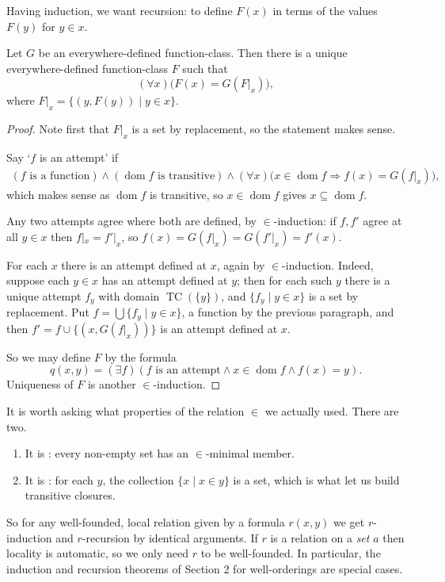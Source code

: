 \documentclass[a4paper]{scrartcl}
\newcommand{\dom}{\operatorname{dom}}
\newcommand{\TC}{\operatorname{TC}}
\begin{document}
Having induction, we want recursion: to define $F(x)$ in terms of the values $F(y)$ for $y \in x$.

\begin{theorem}\label{thm:epsilonrecursion}
Let $G$ be an everywhere-defined function-class. Then there is a unique everywhere-defined function-class $F$ such that
$$(\forall x)\bigl(F(x) = G(F|_x)\bigr),$$
where $F|_x = \{(y, F(y)) \mid y \in x\}$.
\end{theorem}
\begin{proof}
  Note first that $F|_x$ is a set by replacement, so the statement makes sense.

  Say `$f$ is an attempt' if
  \begin{align*}
    (f\text{ is a function}) \land (\dom f\text{ is transitive}) \land (\forall x)\bigl(x \in \dom f \Rightarrow f(x) = G(f|_x)\bigr),
  \end{align*}
  which makes sense as $\dom f$ is transitive, so $x \in \dom f$ gives $x \subseteq \dom f$.

  Any two attempts agree where both are defined, by $\in$-induction: if $f, f'$ agree at all $y \in x$ then $f|_x = f'|_x$, so $f(x) = G(f|_x) = G(f'|_x) = f'(x)$.

  For each $x$ there is an attempt defined at $x$, again by $\in$-induction. Indeed, suppose each $y \in x$ has an attempt defined at $y$; then for each such $y$ there is a unique attempt $f_y$ with domain $\TC(\{y\})$, and $\{f_y \mid y \in x\}$ is a set by replacement. Put $f = \bigcup\{f_y \mid y \in x\}$, a function by the previous paragraph, and then $f' = f \cup \{(x, G(f|_x))\}$ is an attempt defined at $x$.

  So we may define $F$ by the formula
  $$q(x, y) = (\exists f)(f \text{ is an attempt} \land x \in \dom f \land f(x) = y).$$
  Uniqueness of $F$ is another $\in$-induction.
\end{proof}

It is worth asking what properties of the relation $\in$ we actually used. There are two.
\begin{enumerate}[label=(\roman*)]
  \item It is : every non-empty set has an $\in$-minimal member.
  \item It is : for each $y$, the collection $\{x \mid x \in y\}$ is a set, which is what let us build transitive closures.
\end{enumerate}
So for any well-founded, local relation given by a formula $r(x,y)$ we get $r$-induction and $r$-recursion by identical arguments. If $r$ is a relation on a \emph{set} $a$ then locality is automatic, so we only need $r$ to be well-founded. In particular, the induction and recursion theorems of Section 2 for well-orderings are special cases.
\end{document}
